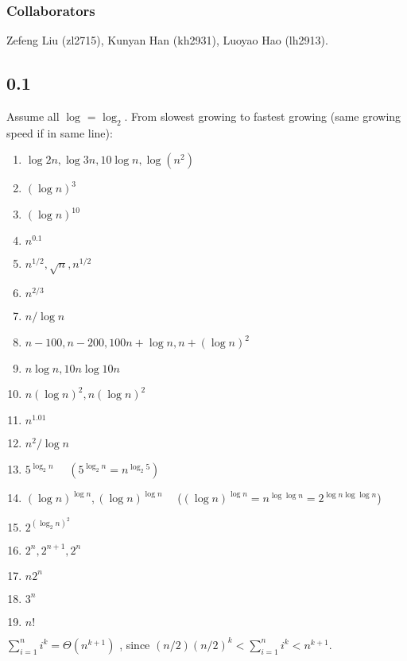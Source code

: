 \documentclass[twoside]{homework}
\begin{document}
\maketitle
\subsubsection*{Collaborators}
Zefeng Liu (zl2715), Kunyan Han (kh2931), Luoyao Hao (lh2913).
\subsection*{0.1}
Assume all $\log $ = $\log_2$.
From slowest growing to fastest growing (same growing speed if in same line):
	\begin{enumerate}
		\item $\log 2n, \log 3n, 10\log n, \log (n^2)$
		\item $(\log n)^3$
		\item $(\log n)^{10}$
		\item $n^{0.1}$
		\item $n^{1/2}, \sqrt{n}, n^{1/2}$
		\item $n^{2/3}$
		\item $n/ \log n$
		\item $n-100, n-200, 100n + \log n, n + (\log n)^2$
		\item $n\log n, 10n\log 10n$
		\item $n(\log n)^2, n(\log n)^2$
		\item $n^{1.01}$
		\item $n^2 / \log n$
		\item $5^{\log_2 n}$ \ \ $(5^{\log_2 n} = n^{\log_2 5})$
		\item $(\log n)^{\log n}, (\log n)^{\log n}$ \ \ ($(\log n)^{\log n} = n^{\log \log n} = 2^{\log n \log \log n}$)
		\item $2^{(\log_2 n)^2}$
		\item $2^n, 2^{n+1}, 2^n$
		\item $n2^n$
		\item $3^n$
		\item $n!$
	\end{enumerate}
	$\sum_{i=1}^n i^k = \Theta(n^{k+1})$ , since $(n/2)(n/2)^{k} < \sum_{i=1}^n i^k < n^{k+1}$.
\end{document}
